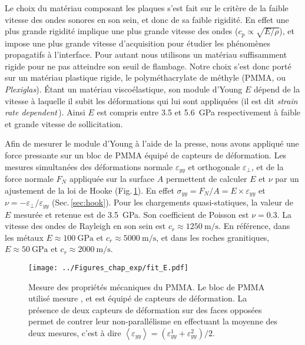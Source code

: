 Le choix du matériau composant les plaques s'est fait sur le critère de la faible vitesse des ondes sonores en son sein, et donc de sa faible rigidité. En effet une plus grande rigidité implique une plus grande vitesse des ondes ($c_p\propto\sqrt{E/\rho}$), et impose une plus grande vitesse d'acquisition pour étudier les phénomènes propagatifs à l'interface. Pour autant nous utilisons un matériau suffisamment rigide pour ne pas atteindre son seuil de flambage. Notre choix s'est donc porté sur un matériau plastique rigide, le polyméthacrylate de méthyle (PMMA, ou \textit{Plexiglas}). Étant un matériau viscoélastique, son module d'Young $E$ dépend de la vitesse à laquelle il subit les déformations qui lui sont appliquées (il est dit \textit{strain rate dependent}\,\cite{mulliken_mechanics_2006}). Ainsi $E$ est compris entre 3.5 et \SI{5.6}{\giga\pascal} respectivement à faible et grande vitesse de sollicitation.

Afin de mesurer le module d'Young à l'aide de la presse, nous avons appliqué une force pressante sur un bloc de PMMA équipé de capteurs de déformation. Les mesures simultanées des déformations normale $\varepsilon_{yy}$ et orthogonale $\varepsilon_\perp$, et de la force normale $F_N$ appliquée sur la surface $A$ permettent de calculer $E$ et $\nu$ par un ajustement de la loi de Hooke (Fig.\,\ref{fig:fitE}). En effet $\sigma_{yy} = {F_N}/{A}=E\times\varepsilon_{yy}$ et $\nu = -{\varepsilon_\perp}/{\varepsilon_{yy}}$ (Sec.\,\ref{sec:hook}). Pour les chargements quasi-statiques, la valeur de $E$ mesurée et retenue est de \SI{3.5}{\giga\pascal}. Son coefficient de Poisson est $\nu = 0.3$. La vitesse des ondes de Rayleigh en son sein est $c_r\approx\SI{1250}{\meter\per\second}$. En référence, dans les métaux $E\approx\SI{100}{\giga\pascal}$ et $c_r\approx\SI{5000}{\meter\per\second}$, et dans les roches granitiques, $E\approx\SI{50}{\giga\pascal}$ et $c_r\approx\SI{2000}{\meter\per\second}$.

\begin{figure}[h!]
\centering	
\texttt{[image: ../Figures\_chap\_exp/fit\_E.pdf]}
\caption[Mesure de $E$]{Mesure des propriétés mécaniques du PMMA. Le bloc de PMMA utilisé mesure , et est équipé de capteurs de déformation. La présence de deux capteurs de déformation sur des faces opposées permet de contrer leur non-parallélisme en effectuant la moyenne des deux mesures, c'est à dire $\left\langle\varepsilon_{yy}\right\rangle=(\varepsilon_{yy}^1+\varepsilon_{yy}^2)/2$.}
\label{fig:fitE}
\end{figure}






